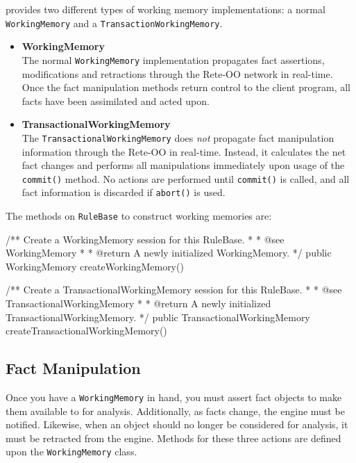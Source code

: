 \drools{} provides two different types of working memory
implementations: a normal \verb|WorkingMemory| and a
\verb|TransactionWorkingMemory|.

\begin{itemize}

	\item \textbf{\textsf{WorkingMemory}} \\
		The normal \verb|WorkingMemory| implementation 
		propagates fact assertions, modifications and
		retractions through the Rete-OO network in
		real-time.  Once the fact manipulation 
		methods return control to the client program,
		all facts have been assimilated and acted upon.

	\item \textbf{\textsf{TransactionalWorkingMemory}} \\
		The \verb|TransactionalWorkingMemory| does \emph{not}
		propagate fact manipulation information through the
		Rete-OO in real-time.  Instead, it calculates the net
		fact changes and performs all manipulations immediately
		upon usage of the \verb|commit()| method.  No actions
		are performed until \verb|commit()| is called, and
		all fact information is discarded if \verb|abort()|
		is used.

\end{itemize}

The methods on \verb|RuleBase| to construct working memories are:

\bigskip

\begin{codelisting}    
/** Create a WorkingMemory session for this RuleBase.
 *
 *  @see WorkingMemory
 *
 *  @return A newly initialized WorkingMemory.
 */
public WorkingMemory createWorkingMemory() 

/** Create a TransactionalWorkingMemory session for this RuleBase.
 *
 *  @see TransactionalWorkingMemory
 *
 *  @return A newly initialized TransactionalWorkingMemory.
 */
public TransactionalWorkingMemory createTransactionalWorkingMemory()
\end{codelisting}

\subsection{Fact Manipulation}

Once you have a \verb|WorkingMemory| in hand, you must assert fact
objects to make them available to \drools{} for analysis.  Additionally, as facts
change, the engine must be notified.  Likewise, when an object should
no longer be considered for analysis, it must be retracted from
the engine.  Methods for these three actions are defined upon the
\verb|WorkingMemory| class.

